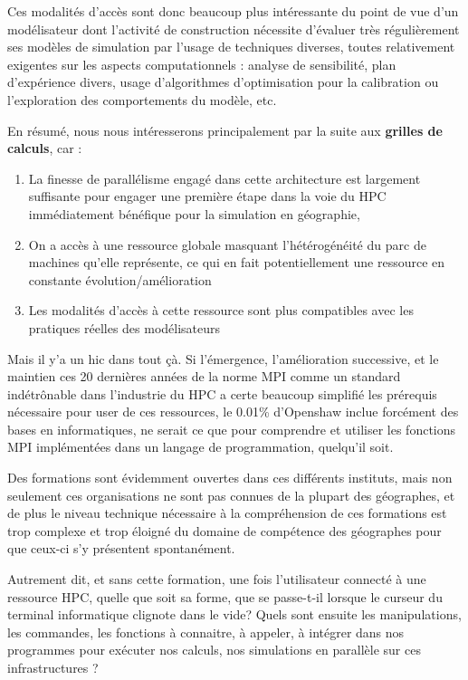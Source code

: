 Ces modalités d'accès sont donc beaucoup plus intéressante du point de vue d'un modélisateur dont l'activité de construction nécessite d'évaluer très régulièrement ses modèles de simulation par l'usage de techniques diverses, toutes relativement exigentes sur les aspects computationnels : analyse de sensibilité, plan d'expérience divers, usage d'algorithmes d'optimisation pour la calibration ou l'exploration des comportements du modèle, etc.

En résumé, nous nous intéresserons principalement par la suite aux \textbf{grilles de calculs}, car :

\begin{enumerate}[label=(\alph*),labelindent=\parindent,leftmargin=*]
\item La finesse de parallélisme engagé dans cette architecture est largement suffisante pour engager une première étape dans la voie du HPC immédiatement bénéfique pour la simulation en géographie,
\item On a accès à une ressource globale masquant l'hétérogénéité du parc de machines qu'elle représente, ce qui en fait potentiellement une ressource en constante évolution/amélioration
\item Les modalités d'accès à cette ressource sont plus compatibles avec les pratiques réelles des modélisateurs
\end{enumerate}

Mais il y'a un hic dans tout çà. Si l'émergence, l'amélioration successive, et le maintien ces 20 dernières années de la norme MPI comme un standard indétrônable dans l'industrie du HPC a certe beaucoup simplifié les prérequis nécessaire pour user de ces ressources, le 0.01\% d'Openshaw inclue forcément des bases en informatiques, ne serait ce que pour comprendre et utiliser les fonctions MPI implémentées dans un langage de programmation, quelqu'il soit.

Des formations sont évidemment ouvertes dans ces différents instituts, mais non seulement ces organisations ne sont pas connues de la plupart des géographes, et de plus le niveau technique nécessaire à la compréhension de ces formations est trop complexe et trop éloigné du domaine de compétence des géographes pour que ceux-ci s'y présentent spontanément.

Autrement dit, et sans cette formation, une fois l'utilisateur connecté à une ressource HPC, quelle que soit sa forme, que se passe-t-il lorsque le curseur du terminal informatique clignote dans le vide? Quels sont ensuite les manipulations, les commandes, les fonctions à connaitre, à appeler, à intégrer dans nos programmes pour exécuter nos calculs, nos simulations en parallèle sur ces infrastructures ?

